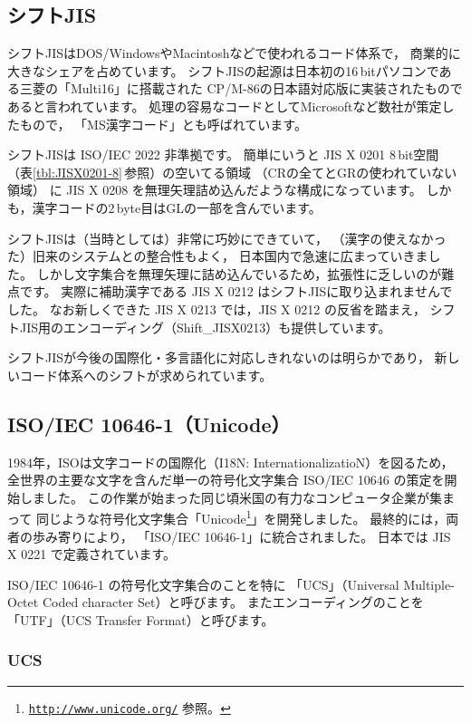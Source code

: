 \documentclass[a4j,10pt,fleqn,uplatex]{jsarticle}
\begin{document}
\subsection{シフトJIS} \label{sec:shiftJIS}

シフトJISはDOS/WindowsやMacintoshなどで使われるコード体系で，
商業的に大きなシェアを占めています。
シフトJISの起源は日本初の16\,bitパソコンである三菱の「Multi16」に搭載された
CP/M-86の日本語対応版に実装されたものであると言われています。
処理の容易なコードとしてMicrosoftなど数社が策定したもので，
「MS漢字コード」とも呼ばれています。

シフトJISは ISO/IEC 2022 非準拠です。
簡単にいうと JIS X 0201 8\,bit空間（表\ref{tbl:JISX0201-8}\,参照）の空いてる領域
（CRの全てとGRの使われていない領域）
に JIS X 0208 を無理矢理詰め込んだような構成になっています。
しかも，漢字コードの2\,byte目はGLの一部を含んでいます。

シフトJISは（当時としては）非常に巧妙にできていて，
（漢字の使えなかった）旧来のシステムとの整合性もよく，
日本国内で急速に広まっていきました。
しかし文字集合を無理矢理に詰め込んでいるため，拡張性に乏しいのが難点です。
実際に補助漢字である JIS X 0212 はシフトJISに取り込まれませんでした。
なお新しくできた JIS X 0213 では，JIS X 0212 の反省を踏まえ，
シフトJIS用のエンコーディング（Shift\_JISX0213）も提供しています。

シフトJISが今後の国際化・多言語化に対応しきれないのは明らかであり，
新しいコード体系へのシフトが求められています。


\subsection{ISO/IEC 10646-1（Unicode）} \label{sec:Unicode}

1984年，ISOは文字コードの国際化（I18N: InternationalizatioN）を図るため，
全世界の主要な文字を含んだ単一の符号化文字集合 ISO/IEC 10646 の策定を開始しました。
この作業が始まった同じ頃米国の有力なコンピュータ企業が集まって
同じような符号化文字集合「Unicode\footnote{
    \href{http://www.unicode.org/}{\texttt{http://www.unicode.org/}} 参照。
}」を開発しました。
最終的には，両者の歩み寄りにより，
「ISO/IEC 10646-1」に統合されました。
日本では JIS X 0221 で定義されています。

ISO/IEC 10646-1 の符号化文字集合のことを特に
「UCS」（Universal Multiple-Octet Coded character Set）と呼びます。
またエンコーディングのことを
「UTF」（UCS Transfer Format）と呼びます。

\subsubsection{UCS}
\end{document}
